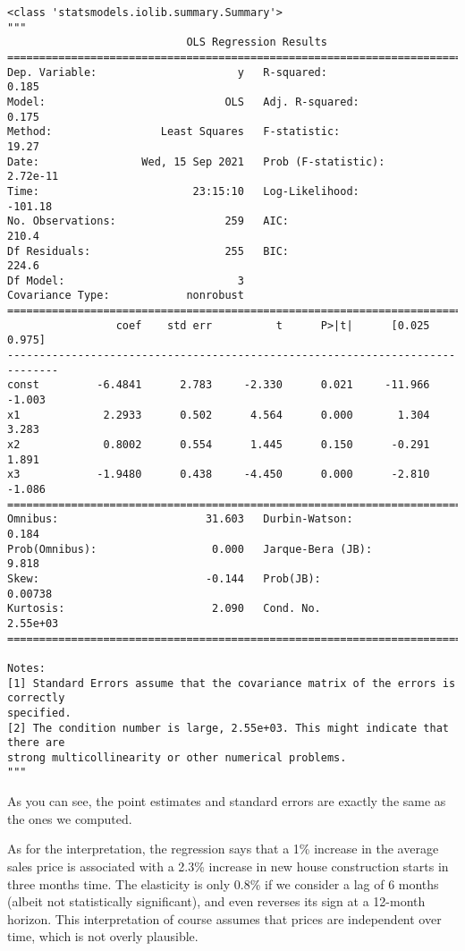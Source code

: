 \documentclass[10pt]{scrartcl}
\makeatletter
\newcommand{\boxspacing}{\kern\kvtcb@left@rule\kern\kvtcb@boxsep}
\newcommand{\prompt}[4]{
        {\ttfamily\llap{{\color{#2}[#3]:\hspace{3pt}#4}}\vspace{-\baselineskip}}
    }
\makeatother
\begin{document}
            \begin{tcolorbox}[breakable, size=fbox, boxrule=.5pt, pad at break*=1mm, opacityfill=0]
\prompt{Out}{outcolor}{26}{\boxspacing}
\begin{Verbatim}[commandchars=\\\{\}]
<class 'statsmodels.iolib.summary.Summary'>
"""
                            OLS Regression Results
==============================================================================
Dep. Variable:                      y   R-squared:                       0.185
Model:                            OLS   Adj. R-squared:                  0.175
Method:                 Least Squares   F-statistic:                     19.27
Date:                Wed, 15 Sep 2021   Prob (F-statistic):           2.72e-11
Time:                        23:15:10   Log-Likelihood:                -101.18
No. Observations:                 259   AIC:                             210.4
Df Residuals:                     255   BIC:                             224.6
Df Model:                           3
Covariance Type:            nonrobust
==============================================================================
                 coef    std err          t      P>|t|      [0.025      0.975]
------------------------------------------------------------------------------
const         -6.4841      2.783     -2.330      0.021     -11.966      -1.003
x1             2.2933      0.502      4.564      0.000       1.304       3.283
x2             0.8002      0.554      1.445      0.150      -0.291       1.891
x3            -1.9480      0.438     -4.450      0.000      -2.810      -1.086
==============================================================================
Omnibus:                       31.603   Durbin-Watson:                   0.184
Prob(Omnibus):                  0.000   Jarque-Bera (JB):                9.818
Skew:                          -0.144   Prob(JB):                      0.00738
Kurtosis:                       2.090   Cond. No.                     2.55e+03
==============================================================================

Notes:
[1] Standard Errors assume that the covariance matrix of the errors is correctly
specified.
[2] The condition number is large, 2.55e+03. This might indicate that there are
strong multicollinearity or other numerical problems.
"""
\end{Verbatim}
\end{tcolorbox}
        
    As you can see, the point estimates and standard errors are exactly the
same as the ones we computed.

As for the interpretation, the regression says that a 1\% increase in
the average sales price is associated with a 2.3\% increase in new house
construction starts in three months time. The elasticity is only 0.8\%
if we consider a lag of 6 months (albeit not statistically significant),
and even reverses its sign at a 12-month horizon. This interpretation of
course assumes that prices are independent over time, which is not
overly plausible.


    
    
    
\end{document}
